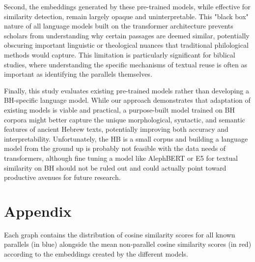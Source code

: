 \documentclass[12pt]{article}
\begin{document}
Second, the embeddings generated by these pre-trained models, while effective for similarity detection, remain largely opaque and uninterpretable. This "black box" nature of all language models built on the transformer architecture prevents scholars from understanding why certain passages are deemed similar, potentially obscuring important linguistic or theological nuances that traditional philological methods would capture. This limitation is particularly significant for biblical studies, where understanding the specific mechanisms of textual reuse is often as important as identifying the parallels themselves.

Finally, this study evaluates existing pre-trained models rather than developing a BH-specific language model. While our approach demonstrates that adaptation of existing models is viable and practical, a purpose-built model trained on BH corpora might better capture the unique morphological, syntactic, and semantic features of ancient Hebrew texts, potentially improving both accuracy and interpretability. Unfortunately, the HB is a small corpus and building a language model from the ground up is probably not feasible with the data needs of transformers, although fine tuning a model like AlephBERT or E5 for textual similarity on BH should not be ruled out and could actually point toward productive avenues for future research.


\clearpage
\appendix
\section*{Appendix}

Each graph contains the distribution of cosine similarity scores for all known parallels (in blue) alongside the mean non-parallel cosine similarity scores (in red) according to the embeddings created by the different models.
\end{document}
